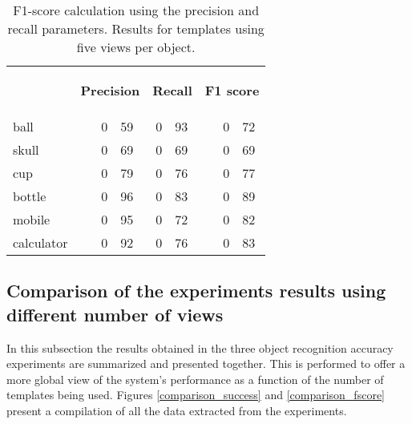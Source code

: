 \begin{table}[H]
\centering
\begin{tabular} {l l r@{.}l r@{.}l l r@{.}l }
\toprule
\addlinespace[3mm]
   \multicolumn{1}{c}{\begin{center}\textbf{Object}\end{center}} &
   \multicolumn{3}{c}{\begin{flushright}\textbf{Precision}\end{flushright}} &
   \multicolumn{2}{c}{\begin{flushright}\textbf{Recall}\end{flushright}} &
   \multicolumn{3}{c}{\begin{flushright}\hspace*{0.2cm}\textbf{F1 score}\end{flushright}} &\\
\addlinespace[-3mm]

\midrule
ball		&&	0&59 	&	0&93	&&	0&72	\\
skull		&&	0&69	&	0&69	&&	0&69	\\
cup			&&	0&79	&	0&76	&&	0&77	\\
bottle		&&	0&96	&	0&83	&&	0&89	\\
mobile		&&	0&95	&	0&72	&&	0&82	\\
calculator	&&	0&92	&	0&76	&&	0&83	\\

\bottomrule
\end{tabular}
\caption[F1-score - templates using 5 views]{F1-score calculation using the precision and recall parameters. Results for templates using five views per object. }
\label{10views_fscore}
\end{table}



	\subsection{Comparison of the experiments results using different number of views}

	In this subsection the results obtained in the three object recognition accuracy experiments are summarized and presented together. 
	This is performed to offer a more global view of the system's performance as a function of the number of templates being used. 
	Figures \ref{comparison_success} and \ref{comparison_fscore} present a compilation of all the data extracted from the experiments. 
	\\



